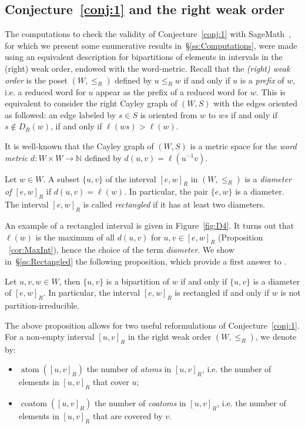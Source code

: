 \documentclass[Unicode]{cedram-alco}
\theoremstyle{definition}
\newcommand{\coatom}{\operatorname{coatom}}
\newcommand{\atom}{\operatorname{atom}}
\begin{document}
\subsection{Conjecture~\ref{conj:1} and the right weak order}\label{ss:Weak}   The computations to check the validity of Conjecture~\ref{conj:1} with SageMath~\cite{sage}, for which we present some enumerative results in~\S\ref{ss:Computations},  were made using an equivalent description for bipartitions of elements  in intervals in the (right) weak order, endowed with the word-metric. Recall that the {\em (right) weak order} is the poset $(W,\leq_R)$  defined by $u\leq_R w$ if and only if $u$ is a {\em prefix} of $w$, i.e. a reduced word for $u$ appear as the prefix of a reduced word for $w$. This is equivalent to consider the right Cayley graph of $(W,S)$ with the edges oriented as followed: an edge labeled by $s\in S$ is oriented from $w$ to $ws$ if and only if $s\notin D_R(w)$, if and only if $\ell(ws)>\ell(w)$. 

It is well-known that the Cayley graph of $(W,S)$ is a metric space for the {\em word metric} $d:W\times W\to \mathbb N$ defined by  $d(u,v)=\ell(u^{-1}v)$. 

\begin{defi}\label{def:2} Let $w\in W$. A subset $\{u,v\}$ of the interval  $[e,w]_R$ in $(W,\leq_R)$ is a {\em diameter of  $[e,w]_R$} if $d(u,v)=\ell(w)$. In particular, the pair $\{e,w\}$ is a diameter. The interval $[e,w]_R$ is called {\em rectangled} if it has at least two diameters. 
\end{defi}

An example of a rectangled interval is given in Figure~\ref{fig:D4}. It turns out that $\ell(w)$ is the maximum of all $d(u,v)$ for $u,v\in [e,w]_R$ (Proposition ~\ref{cor:MaxInt}),  hence the choice of the term {\em diameter}. We show in~\S\ref{ss:Rectangled} the following proposition, which provide a first answer to  \cite[Question~6]{DiRo09}.

\begin{prop}\label{prop:rectangled} Let  $u,v,w\in W$, then $\{u,v\}$ is a bipartition of $w$ if and only if $\{u,v\}$ is a diameter of $[e,w]_R$. In particular, the interval $[e,w]_R$ is rectangled if and only if $w$ is not partition-irreducible.
\end{prop}

The above proposition allows for two useful reformulations of Conjecture~\ref{conj:1}.  For a non-empty interval $[u,v]_R$ in the right weak order $(W,\leq_R)$, we denote by:
\begin{itemize}
\item $\atom([u,v]_R)$ the number of  {\em atoms} in $[u,v]_R$, i.e. the number of elements in $[u,v]_R$ that cover  $u$; 
\item $\coatom([u,v]_R)$ the number of  {\em coatoms} in $[u,v]_R$, i.e. the number of elements in $[u,v]_R$ that are covered by $v$.
\end{itemize}
\end{document}
